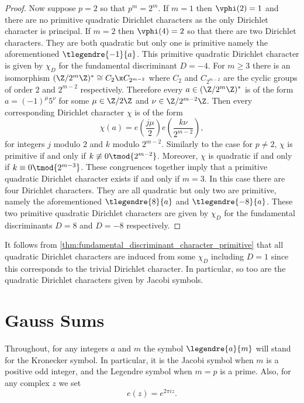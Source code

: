 \documentclass[12pt]{article}
\begin{document}
\begin{proof}
        Now suppose \(p = 2\) so that \(p^{m} = 2^{m}\). If \(m = 1\) then \(\vphi(2) = 1\) and there are no primitive quadratic Dirichlet characters as the only Dirichlet character is principal. If \(m = 2\) then \(\vphi(4) = 2\) so that there are two Dirichlet characters. They are both quadratic but only one is primitive namely the aforementioned \(\tlegendre{-1}{a}\). This primitive quadratic Dirichlet character is given by \(\chi_{D}\) for the fundamental discriminant \(D = -4\). For \(m \ge 3\) there is an isomorphism \((\Z/2^{m}\Z)^{\ast} \cong C_{2} \x C_{2^{m-2}}\) where \(C_{2}\) and \(C_{2^{m-2}}\) are the cyclic groups of order \(2\) and \(2^{m-2}\) respectively. Therefore every \(a \in (\Z/2^{m}\Z)^{\ast}\) is of the form \(a = (-1)^{\mu}5^{\nu}\) for some \(\mu \in \Z/2\Z\) and \(\nu \in \Z/2^{m-2}\Z\). Then every corresponding Dirichlet character \(\chi\) is of the form
        \[
          \chi(a) = e\left(\frac{j\mu}{2}\right)e\left(\frac{k\nu}{2^{m-2}}\right),
        \]
        for integers \(j\) modulo \(2\) and \(k\) modulo \(2^{m-2}\). Similarly to the case for \(p \neq 2\), \(\chi\) is primitive if and only if \(k \not\equiv 0 \tmod{2^{m-2}}\). Moreover, \(\chi\) is quadratic if and only if \(k \equiv 0 \tmod{2^{m-3}}\). These congruences together imply that a primitive quadratic Dirichlet character exists if and only if \(m = 3\). In this case there are four Dirichlet characters. They are all quadratic but only two are primitive, namely the aforementioned \(\tlegendre{8}{a}\) and \(\tlegendre{-8}{a}\). These two primitive quadratic Dirichlet characters are given by \(\chi_{D}\) for the fundamental discriminants \(D = 8\) and \(D = -8\) respectively.
      \end{proof}

      It follows from \cref{thm:fundamental_discriminant_character_primitive} that all quadratic Dirichlet characters are induced from some \(\chi_{D}\) including \(D = 1\) since this corresponds to the trivial Dirichlet character. In particular, so too are the quadratic Dirichlet characters given by Jacobi symbols.
  \section{Gauss Sums}
    Throughout, for any integers \(a\) and \(m\) the symbol \(\legendre{a}{m}\) will stand for the Kronecker symbol. In particular, it is the Jacobi symbol when \(m\) is a positive odd integer, and the Legendre symbol when \(m = p\) is a prime. Also, for any complex \(z\) we set
    \[
      e(z) = e^{2\pi iz}.
    \]
\end{document}
